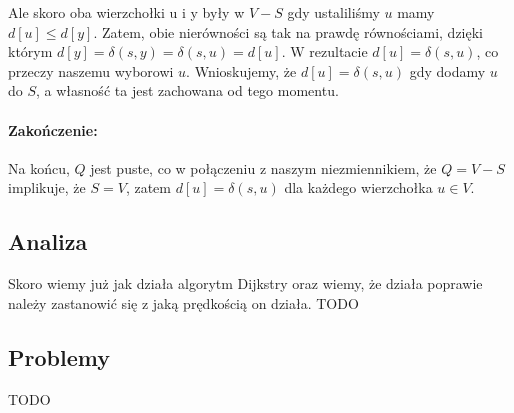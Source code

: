 Ale skoro oba wierzchołki u i y były w $V - S$ gdy ustaliliśmy $u$ mamy $d[u] \le d[y]$.
Zatem, obie nierówności są tak na prawdę równościami, dzięki którym $d[y] = \delta(s, y) = \delta(s, u) = d[u]$.
W rezultacie $d[u] = \delta(s,u)$, co przeczy naszemu wyborowi $u$. Wnioskujemy, że
$d[u] = \delta(s, u)$ gdy dodamy $u$ do $S$, a własność ta jest zachowana od tego momentu.

\paragraph{Zakończenie:} Na końcu, $Q$ jest puste, co w połączeniu z naszym niezmiennikiem, że $Q = V - S$ implikuje,
że $S = V$, zatem $d[u] = \delta(s,u)$ dla każdego wierzchołka $u \in V$.

\subsection{Analiza}

Skoro wiemy już jak działa algorytm Dijkstry oraz wiemy, że działa poprawie należy
zastanowić się z jaką prędkością on działa.
TODO
\subsection{Problemy}
TODO
